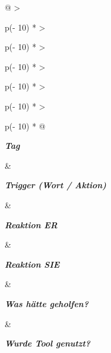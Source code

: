 \begin{longtable}[]{@{}
  >{\raggedright\arraybackslash}p{(\columnwidth - 10\tabcolsep) * }
  >{\raggedright\arraybackslash}p{(\columnwidth - 10\tabcolsep) * }
  >{\raggedright\arraybackslash}p{(\columnwidth - 10\tabcolsep) * }
  >{\raggedright\arraybackslash}p{(\columnwidth - 10\tabcolsep) * }
  >{\raggedright\arraybackslash}p{(\columnwidth - 10\tabcolsep) * }
  >{\raggedright\arraybackslash}p{(\columnwidth - 10\tabcolsep) * }@{}}
\toprule\noalign{}
\begin{minipage}[b]{\linewidth}\raggedright
\emph{\textbf{Tag}}
\end{minipage} \& \begin{minipage}[b]{\linewidth}\raggedright
\emph{\textbf{Trigger (Wort / Aktion)}}
\end{minipage} \& \begin{minipage}[b]{\linewidth}\raggedright
\emph{\textbf{Reaktion ER}}
\end{minipage} \& \begin{minipage}[b]{\linewidth}\raggedright
\emph{\textbf{Reaktion SIE}}
\end{minipage} \& \begin{minipage}[b]{\linewidth}\raggedright
\emph{\textbf{Was hätte geholfen?}}
\end{minipage} \& \begin{minipage}[b]{\linewidth}\raggedright
\emph{\textbf{Wurde Tool genutzt?}}


\end{minipage}
\end{longtable}
